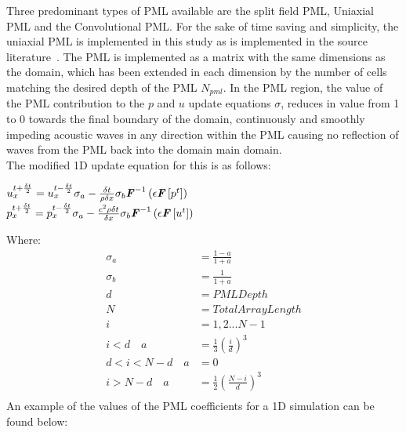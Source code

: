Three predominant types of PML available are the split field PML, Uniaxial PML and the Convolutional PML. For the sake of time saving and simplicity, the uniaxial PML is implemented in this study as is implemented in the source literature~\cite{Angus2010}. The PML is implemented as a matrix with the same dimensions as the domain, which has been extended in each dimension by the number of cells matching the desired depth of the PML $N_{pml}$. In the PML region, the value of the PML contribution to the $p$ and $u$ update equations $\sigma$, reduces in value from 1 to 0 towards the final boundary of the domain, continuously and smoothly impeding acoustic waves in any direction within the PML causing no reflection of waves from the PML back into the domain main domain.\\
 
The modified 1D update equation for this is as follows:\\
\begin{center}
$u^{t + \frac{\delta t}{2}}_{x} = u^{t - \frac{\delta t}{2}}_{x} \sigma_a - \frac{\delta t}{\rho \delta x} \sigma_b \textbf{\textit{F}}^{-1}\left(\epsilon \textbf{\textit{F}}\left[p^{t}\right] \right)$\\
$p^{t + \frac{\delta t}{2}}_{x} = p^{t - \frac{\delta t}{2}}_{x} \sigma_a - \frac{c^2 \rho \delta t}{\delta x} \sigma_b \textbf{\textit{F}}^{-1}\left( \epsilon \textbf{\textit{F}} \left[ u^{t} \right] \right)$\\
\end{center}
Where:\\
\begin{equation}
\begin{aligned}
\sigma_a & = \frac{1-a}{1+a} \\
\sigma_b & = \frac{1}{1 + a} \\
d & = PML Depth\\
N & = Total Array Length \\
i & = 1,2... N-1\\
i < d \quad a & = \frac{1}{3} \left( \frac{i}{d} \right)^3\\
d < i < N - d \quad a & = 0\\
i > N-d \quad a & = \frac{1}{2} \left( \frac{N - i}{d} \right) ^3 \\ 
\end{aligned}
\end{equation}
An example of the values of the PML coefficients for a 1D simulation can be found below:\\

